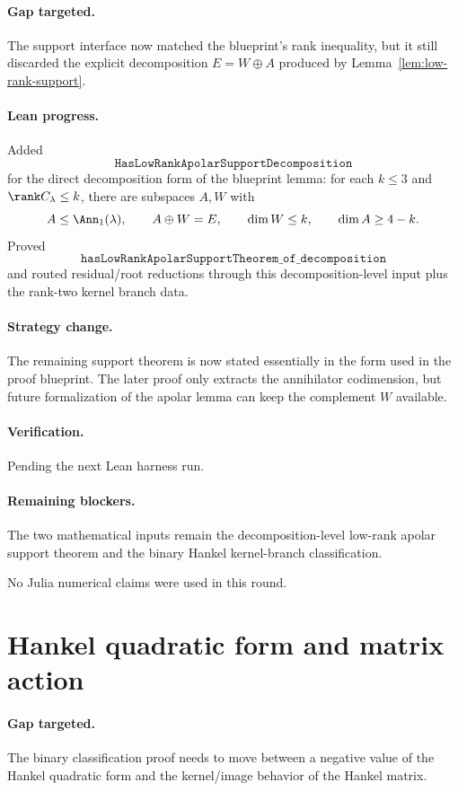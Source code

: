 \documentclass[11pt]{article}
\begin{document}
\paragraph{Gap targeted.}
The support interface now matched the blueprint's rank inequality, but it still
discarded the explicit decomposition \(E=W\oplus A\) produced by
Lemma~\ref{lem:low-rank-support}.

\paragraph{Lean progress.}
Added
\[
\texttt{HasLowRankApolarSupportDecomposition}
\]
for the direct decomposition form of the blueprint lemma: for each
\(k\le3\) and \(\rank C_\lambda\le k\), there are subspaces \(A,W\) with
\[
A\le\Ann_1(\lambda),\qquad A\oplus W=E,\qquad \dim W\le k,\qquad
\dim A\ge4-k.
\]
Proved
\[
\texttt{hasLowRankApolarSupportTheorem\_of\_decomposition}
\]
and routed residual/root reductions through this decomposition-level input
plus the rank-two kernel branch data.

\paragraph{Strategy change.}
The remaining support theorem is now stated essentially in the form used in
the proof blueprint.  The later proof only extracts the annihilator
codimension, but future formalization of the apolar lemma can keep the
complement \(W\) available.

\paragraph{Verification.}
Pending the next Lean harness run.

\paragraph{Remaining blockers.}
The two mathematical inputs remain the decomposition-level low-rank apolar
support theorem and the binary Hankel kernel-branch classification.

No Julia numerical claims were used in this round.

\section*{Hankel quadratic form and matrix action}

\paragraph{Gap targeted.}
The binary classification proof needs to move between a negative value of the
Hankel quadratic form and the kernel/image behavior of the Hankel matrix.
\end{document}

